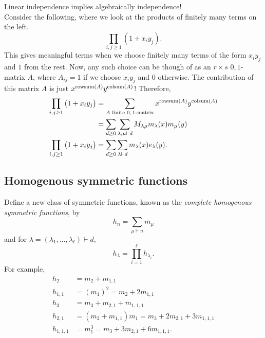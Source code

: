 	Linear independence implies algebraically independence!\\

	Consider the following, where we look at the products of finitely many terms on the left.
	\[ \prod_{i,j \ge 1} \left( 1 + x_iy_j \right). \]
	This gives meaningful terms when we choose finitely many terms of the form $x_iy_j$ and $1$ from the rest. Now, any such choice can be though of as an $r \times s$ $0,1$-matrix $A$, where $A_{ij} = 1$ if we choose $x_i y_j$ and $0$ otherwise. The contribution of this matrix $A$ is just $x^{\operatorname{rowsum}(A)} y^{\operatorname{colsum}(A)}$! Therefore,
	\begin{align}
		\prod_{i,j \ge 1} \left( 1 + x_i y_j \right) &= \sum_{\text{$A$ finite $0,1$-matrix}} x^{\operatorname{rowsum}(A)} y^{\operatorname{colsum}(A)} \nonumber \\
			&= \sum_{d \ge 0} \sum_{\lambda,\mu \vdash d} M_{\lambda\mu} m_\lambda(x) m_\mu(y) \nonumber \\
		\prod_{i,j \ge 1} \left(1 + x_iy_j\right)  &= \sum_{d \ge 0} \sum_{\lambda \vdash d} m_\lambda(x) e_\lambda(y). \label{eqn: prod 1 p xi yj}
	\end{align}

\subsection{Homogenous symmetric functions}

	Define a new class of symmetric functions, known as the \emph{complete homogenous symmetric functions}, by
	\[ h_n = \sum_{\mu \vdash n} m_\mu \]
	and for $\lambda = (\lambda_1,\ldots,\lambda_\ell) \vdash d$,
	\[ h_\lambda = \prod_{i=1}^{\ell} h_{\lambda_i}. \]
	For example,
	\begin{align*}
		h_2 &= m_2 + m_{1,1} \\
		h_{1,1} &= (m_1)^2 = m_2 + 2m_{1,1} \\
		h_3 &= m_3 + m_{2,1} + m_{1,1,1} \\
		h_{2,1} &= (m_2 + m_{1,1}) m_1 = m_3 + 2m_{2,1} + 3m_{1,1,1} \\
		h_{1,1,1} &= m_1^3 = m_3 + 3m_{2,1} + 6m_{1,1,1}.
	\end{align*}

